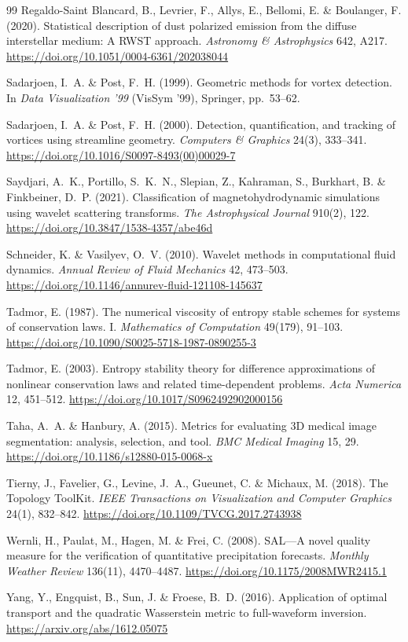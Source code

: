 \documentclass[11pt]{article}
\begin{document}
\begin{thebibliography}{99}
 Regaldo-Saint Blancard, B., Levrier, F., Allys, E., Bellomi, E. \&
Boulanger, F. (2020). Statistical description of dust polarized emission from the diffuse
interstellar medium: A RWST approach. \emph{Astronomy \& Astrophysics} 642, A217.
\url{https://doi.org/10.1051/0004-6361/202038044}

 Sadarjoen, I.\ A. \& Post, F.\ H. (1999). Geometric methods for vortex
detection. In \emph{Data Visualization '99} (VisSym '99), Springer, pp.\ 53--62.

 Sadarjoen, I.\ A. \& Post, F.\ H. (2000). Detection, quantification,
and tracking of vortices using streamline geometry. \emph{Computers \& Graphics} 24(3),
333--341. \url{https://doi.org/10.1016/S0097-8493(00)00029-7}

 Saydjari, A.\ K., Portillo, S.\ K.\ N., Slepian, Z., Kahraman, S.,
Burkhart, B. \& Finkbeiner, D.\ P. (2021). Classification of magnetohydrodynamic simulations
using wavelet scattering transforms. \emph{The Astrophysical Journal} 910(2), 122.
\url{https://doi.org/10.3847/1538-4357/abe46d}

 Schneider, K. \& Vasilyev, O.\ V. (2010). Wavelet methods in
computational fluid dynamics. \emph{Annual Review of Fluid Mechanics} 42, 473--503.
\url{https://doi.org/10.1146/annurev-fluid-121108-145637}

 Tadmor, E. (1987). The numerical viscosity of entropy stable schemes for
systems of conservation laws. I. \emph{Mathematics of Computation} 49(179), 91--103.
\url{https://doi.org/10.1090/S0025-5718-1987-0890255-3}

 Tadmor, E. (2003). Entropy stability theory for difference approximations
of nonlinear conservation laws and related time-dependent problems.
\emph{Acta Numerica} 12, 451--512. \url{https://doi.org/10.1017/S0962492902000156}

 Taha, A.\ A. \& Hanbury, A. (2015). Metrics for evaluating 3D medical image
segmentation: analysis, selection, and tool. \emph{BMC Medical Imaging} 15, 29.
\url{https://doi.org/10.1186/s12880-015-0068-x}

 Tierny, J., Favelier, G., Levine, J.\ A., Gueunet, C. \& Michaux, M.
(2018). The Topology ToolKit. \emph{IEEE Transactions on Visualization and Computer Graphics}
24(1), 832--842. \url{https://doi.org/10.1109/TVCG.2017.2743938}

 Wernli, H., Paulat, M., Hagen, M. \& Frei, C. (2008). SAL---A novel
quality measure for the verification of quantitative precipitation forecasts.
\emph{Monthly Weather Review} 136(11), 4470--4487.
\url{https://doi.org/10.1175/2008MWR2415.1}

 Yang, Y., Engquist, B., Sun, J. \& Froese, B.\ D. (2016). Application of
optimal transport and the quadratic Wasserstein metric to full-waveform inversion.
\url{https://arxiv.org/abs/1612.05075}

\end{thebibliography}
\end{document}
